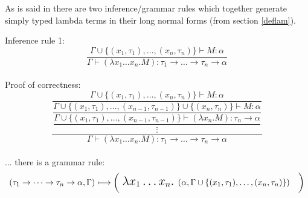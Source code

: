 \documentclass[12pt,a4paper]{report}
\begin{document}
As is said in \cite{barendregt10} there are two
inference/grammar rules which together generate
simply typed lambda terms in their long normal forms
(from section \ref{deflam}).


Inference rule 1: 
\[
	\frac{\Gamma \cup \{ (x_1,\tau_1),\dots,(x_n,\tau_n) \} \vdash M : \alpha }
	     {\Gamma \vdash (\lambda x_1 \dots x_n . M) : 
	     \tau_1 \rightarrow \dots \rightarrow \tau_n \rightarrow \alpha }
\]
\\
Proof of correctness:
\[
	\dfrac{
		\dfrac
		 {\Gamma \cup \{ (x_1,\tau_1),\dots,(x_n,\tau_n) \} \vdash M : \alpha}
		 {\dfrac
		   {\Gamma \cup \{ (x_1,\tau_1),\dots,(x_{n-1},\tau_{n-1})\} \cup 
		                \{(x_n,\tau_n) \} \vdash M : \alpha}
		   {\dfrac{\Gamma \cup \{ (x_1,\tau_1),\dots,(x_{n-1},\tau_{n-1})\}  
		                \vdash (\lambda x_n . M) : \tau_n \rightarrow \alpha}
				  { \vdots }		   
		   }
		 }		 
	 }
	     {\Gamma \vdash (\lambda x_1 \dots x_n . M) : 
	     \tau_1 \rightarrow \dots \rightarrow \tau_n \rightarrow \alpha }
\]
\\
... there is a grammar rule:
\[ 
	( \tau_1 \rightarrow \dots \rightarrow \tau_n \rightarrow \alpha , \Gamma )  \longmapsto
	\bigg( \mbox{ {\Large 
	$\lambda x_1 \dots x_n .$ 
	}}( \alpha , \Gamma \cup \{ (x_1,\tau_1),\dots,(x_n,\tau_n) \} ) \quad \bigg)
\]
\\
\end{document}
